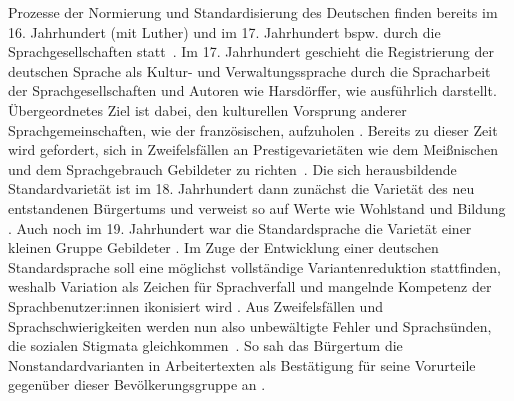 Prozesse der Normierung und Standardisierung des Deutschen finden bereits im 16. Jahrhundert (mit Luther) und im 17. Jahrhundert bspw. durch die Sprachgesellschaften statt~\citep[s.][16--17, 27]{Hundt.2000}. 
Im 17. Jahrhundert geschieht die Registrierung der deutschen Sprache als Kultur- und Verwaltungssprache durch die Spracharbeit der Sprachgesellschaften und Autoren wie Harsd{\"o}rffer, wie \citet[]{Hundt.2000} ausführlich darstellt. 
Übergeordnetes Ziel ist dabei, den kulturellen Vorsprung anderer Sprachgemeinschaften, wie der französischen, aufzuholen \citep[s.][4]{Hundt.2000}. 
Bereits zu dieser Zeit wird gefordert, sich in Zweifelsf{\"a}llen an Prestigevariet{\"a}ten wie dem Mei{\ss}nischen und dem Sprachgebrauch Gebildeter zu richten~\citep[s.][43]{Hundt.2000}. 
Die sich herausbildende Standardvarietät ist im 18. Jahrhundert dann zunächst die Varietät des neu entstandenen Bürgertums und verweist so auf Werte wie Wohlstand und Bildung \citep[s.][1962--1965]{Mattheier2000}. 
Auch noch im 19. Jahrhundert war die Standardsprache die Varietät einer kleinen Gruppe Gebildeter \citep[s.][2]{Elspa2005}. 
Im Zuge der Entwicklung einer deutschen Standardsprache soll eine möglichst vollständige Variantenreduktion stattfinden, weshalb Variation als Zeichen für Sprachverfall und mangelnde Kompetenz der Sprachbenutzer:innen ikonisiert wird \citep[s.][24]{Klein2003}. 
{\glqq}Aus Zweifelsf{\"a}llen und Sprachschwierigkeiten werden nun also unbew{\"a}ltigte Fehler und Sprachs{\"u}nden, die sozialen Stigmata gleichkommen{\grqq}~\citep[25]{Klein2003}. 
So sah das Bürgertum die Nonstandardvarianten in Arbeitertexten als Bestätigung für seine Vorurteile gegenüber dieser Bevölkerungsgruppe an \citep[s.][1957]{Mattheier2000}. 

